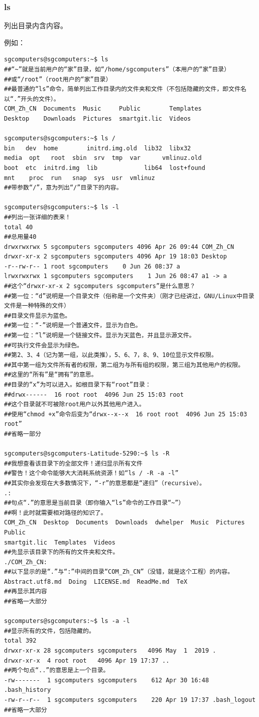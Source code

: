 \documentclass{book}
\begin{document}
\subsubsection{ls}
\cite{manls}\par
列出目录内含内容。\par
例如：
\begin{verbatim}
sgcomputers@sgcomputers:~$ ls
##“~”就是当前用户的“家”目录，如“/home/sgcomputers”（本用户的“家”目录）
##或“/root”（root用户的“家”目录）
##最普通的“ls”命令，简单列出工作目录内的文件夹和文件（不包括隐藏的文件，即文件名以“.”开头的文件）。
COM_Zh_CN  Documents  Music     Public        Templates
Desktop    Downloads  Pictures  smartgit.lic  Videos

sgcomputers@sgcomputers:~$ ls /
bin   dev  home        initrd.img.old  lib32  libx32      
media  opt   root  sbin  srv  tmp  var      vmlinuz.old
boot  etc  initrd.img  lib             lib64  lost+found  
mnt    proc  run   snap  sys  usr  vmlinuz
##带参数“/”，意为列出“/”目录下的内容。

sgcomputers@sgcomputers:~$ ls -l
##列出一张详细的表来！
total 40
##总用量40
drwxrwxrwx 5 sgcomputers sgcomputers 4096 Apr 26 09:44 COM_Zh_CN
drwxr-xr-x 2 sgcomputers sgcomputers 4096 Apr 19 18:03 Desktop
-r--rw-r-- 1 root sgcomputers    0 Jun 26 08:37 a
lrwxrwxrwx 1 sgcomputers sgcomputers    1 Jun 26 08:47 a1 -> a
##这个“drwxr-xr-x 2 sgcomputers sgcomputers”是什么意思？
##第一位：“d”说明是一个目录文件（俗称是一个文件夹）（刚才已经讲过，GNU/Linux中目录文件是一种特殊的文件）
##目录文件显示为蓝色。
##第一位：“-”说明是一个普通文件，显示为白色。
##第一位：“l”说明是一个链接文件。显示为天蓝色，并且显示源文件。
##可执行文件会显示为绿色。
##第2、3、4（记为第一组，以此类推），5、6、7，8、9、10位显示文件权限。
##其中第一组为文件所有者的权限，第二组为与所有组的权限，第三组为其他用户的权限。
##这里的“所有”是“拥有”的意思。
##目录的“x”为可以进入。如根目录下有“root”目录：
##drwx------  16 root root  4096 Jun 25 15:03 root
##这个目录就不可被除root用户以外其他用户进入。
##使用“chmod +x”命令后变为“drwx--x--x  16 root root  4096 Jun 25 15:03 root”
##省略一部分

sgcomputers@sgcomputers-Latitude-5290:~$ ls -R
##我想查看该目录下的全部文件！递归显示所有文件
##警告！这个命令能够大大消耗系统资源！如“ls / -R -a -l”
##其实你会发现在大多数情况下，“-r”的意思都是“递归”（recursive）。
.:
##句点“.”的意思是当前目录（即你输入“ls”命令的工作目录“~”）
##啊！此时就需要相对路径的知识了。
COM_Zh_CN  Desktop  Documents  Downloads  dwhelper  Music  Pictures  Public 
smartgit.lic  Templates  Videos
##先显示该目录下的所有的文件夹和文件。
./COM_Zh_CN:
##以下显示的是“.”与“:”中间的目录“COM_Zh_CN”（没错，就是这个工程）的内容。
Abstract.utf8.md  Doing  LICENSE.md  ReadMe.md  TeX
##再显示其内容
##省略一大部分

sgcomputers@sgcomputers:~$ ls -a -l
##显示所有的文件，包括隐藏的。
total 392
drwxr-xr-x 28 sgcomputers sgcomputers   4096 May  1  2019 .
drwxr-xr-x  4 root root   4096 Apr 19 17:37 ..
##两个句点“..”的意思是上一个目录。
-rw-------  1 sgcomputers sgcomputers    612 Apr 30 16:48 .bash_history
-rw-r--r--  1 sgcomputers sgcomputers    220 Apr 19 17:37 .bash_logout
##省略一大部分
\end{verbatim}
\end{document}

